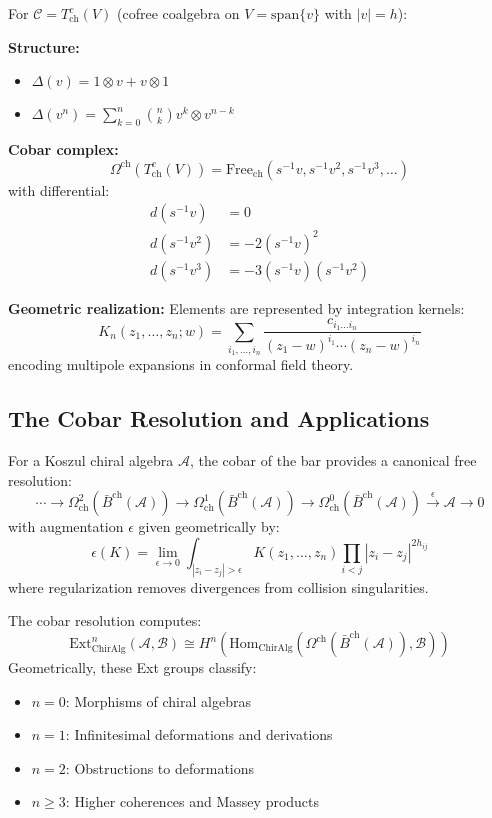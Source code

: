 \begin{example}
For $\mathcal{C} = T^c_{\text{ch}}(V)$ (cofree coalgebra on $V = \text{span}\{v\}$ with $|v| = h$):

\textbf{Structure:}
\begin{itemize}
\item $\Delta(v) = 1 \otimes v + v \otimes 1$
\item $\Delta(v^n) = \sum_{k=0}^n \binom{n}{k} v^k \otimes v^{n-k}$
\end{itemize}

\textbf{Cobar complex:}
\[
\Omega^{\text{ch}}(T^c_{\text{ch}}(V)) = \text{Free}_{\text{ch}}(s^{-1}v, s^{-1}v^2, s^{-1}v^3, \ldots)
\]
with differential:
\begin{align}
d(s^{-1}v) &= 0 \\
d(s^{-1}v^2) &= -2(s^{-1}v)^2 \\
d(s^{-1}v^3) &= -3(s^{-1}v)(s^{-1}v^2)
\end{align}

\textbf{Geometric realization:}
Elements are represented by integration kernels:
\[
K_n(z_1, \ldots, z_n; w) = \sum_{i_1, \ldots, i_n} \frac{c_{i_1\ldots i_n}}{(z_1 - w)^{i_1} \cdots (z_n - w)^{i_n}}
\]
encoding multipole expansions in conformal field theory.
\end{example}

\subsection{The Cobar Resolution and Applications}

\begin{theorem}\label{thm:cobar-resolution}
For a Koszul chiral algebra $\mathcal{A}$, the cobar of the bar provides a canonical free resolution:
\[
\cdots \to \Omega^2_{\text{ch}}(\bar{B}^{\text{ch}}(\mathcal{A})) \to \Omega^1_{\text{ch}}(\bar{B}^{\text{ch}}(\mathcal{A})) \to \Omega^0_{\text{ch}}(\bar{B}^{\text{ch}}(\mathcal{A})) \xrightarrow{\epsilon} \mathcal{A} \to 0
\]
with augmentation $\epsilon$ given geometrically by:
\[
\epsilon(K) = \lim_{\epsilon \to 0} \int_{|z_i - z_j| > \epsilon} K(z_1, \ldots, z_n) \prod_{i < j} |z_i - z_j|^{2h_{ij}}
\]
where regularization removes divergences from collision singularities.
\end{theorem}

\begin{remark}
The cobar resolution computes:
\[
\text{Ext}^n_{\text{ChirAlg}}(\mathcal{A}, \mathcal{B}) \cong H^n(\text{Hom}_{\text{ChirAlg}}(\Omega^{\text{ch}}(\bar{B}^{\text{ch}}(\mathcal{A})), \mathcal{B}))
\]
Geometrically, these Ext groups classify:
\begin{itemize}
\item $n = 0$: Morphisms of chiral algebras
\item $n = 1$: Infinitesimal deformations and derivations
\item $n = 2$: Obstructions to deformations
\item $n \geq 3$: Higher coherences and Massey products
\end{itemize}
\end{remark}

